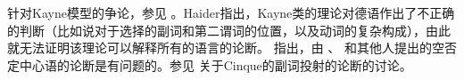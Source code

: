 针对Kayne模型的争论，参见 。Haider指出，Kayne类的理论对德语作出了不正确的判断（比如说对于选择的副词和第二谓词的位置，以及动词的复杂构成），由此就无法证明该理论可以解释所有的语言的论断。 \citet[\S~4]{Haider97a}指出，由 \citet{Pollock89a-u}、 \citet{Haegeman95a-u}和其他人提出的空否定中心语的论断是有问题的。参见 关于Cinque的副词投射的论断的讨论。

